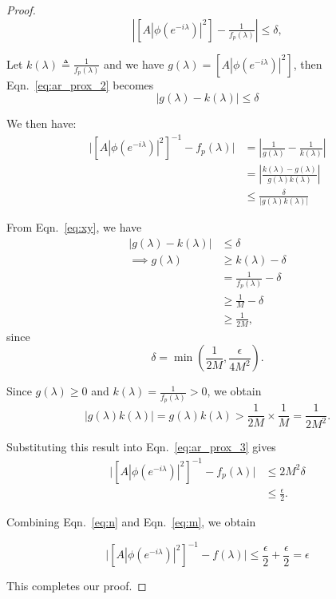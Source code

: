 \documentclass[preprint]{aastex}
\theoremstyle{nonitalicname}
\theoremstyle{plain}
\theoremstyle{remark}
\begin{document}
\begin{proof}
\begin{equation}\label{eq:ar_prox_2}
\left| [A|\phi(e^{-i\lambda})|^2] - \tfrac{1}{f_p(\lambda)} \right| \leq \delta,
\end{equation}

Let  $k(\lambda) \triangleq \tfrac{1}{f_p(\lambda)}$ and we have $g(\lambda) = [A|\phi(e^{-i\lambda})|^2]$, then   Eqn.~\ref{eq:ar_prox_2} becomes
\begin{equation}\label{eq:xy}
    |g(\lambda)-k(\lambda)| \leq \delta
\end{equation}

We then have:
\begin{equation}\label{eq:ar_prox_3}
\begin{aligned}
\big| [A|\phi(e^{-i\lambda})|^2]^{-1} - f_p(\lambda) \big|  & = \left| \frac{1}{g(\lambda)} - \frac{1}{k(\lambda)}\right|\\
&= \left| \frac{k(\lambda)-g(\lambda)}{g(\lambda)k(\lambda)} \right|\\
&\leq \frac{\delta}{|g(\lambda)k(\lambda)|}
\end{aligned}
\end{equation}

From Eqn.~\ref{eq:xy}, we have
\begin{equation}
\begin{aligned}
    |g(\lambda) - k(\lambda)| &\leq \delta \\
    \implies g(\lambda) &\geq k(\lambda) - \delta \\
                        &= \frac{1}{f_p(\lambda)} - \delta \\
                        &\geq \frac{1}{M} - \delta \\
                        &\geq \frac{1}{2M},
\end{aligned}
\end{equation}
since 
\[
\delta = \min\!\left( \frac{1}{2M}, \frac{\epsilon}{4M^2} \right).
\]

Since $g(\lambda) \geq 0$ and $k(\lambda) = \frac{1}{f_p(\lambda)} > 0$, we obtain
\begin{equation}\label{eq:xy_bound}
|g(\lambda)k(\lambda)| 
= g(\lambda)k(\lambda) 
> \frac{1}{2M} \times \frac{1}{M} 
= \frac{1}{2M^2}.
\end{equation}

Substituting this result into Eqn.~\ref{eq:ar_prox_3} gives
\begin{equation}\label{eq:m}
\begin{aligned}
    \big| [A|\phi(e^{-i\lambda})|^2]^{-1} - f_p(\lambda) \big|
    &\leq 2M^2 \delta \\
    &\leq \frac{\epsilon}{2}.
\end{aligned}
\end{equation}

Combining Eqn.~\ref{eq:n} and Eqn.~\ref{eq:m}, we obtain 

\begin{equation}
\mid[A|\phi(e^{-i\lambda})|^2]^{-1} - f(\lambda) \mid \leq \frac{\epsilon}{2 } +  \frac{\epsilon}{2 } = \epsilon
\end{equation}


This completes our proof. 
\end{proof}
\end{document}
